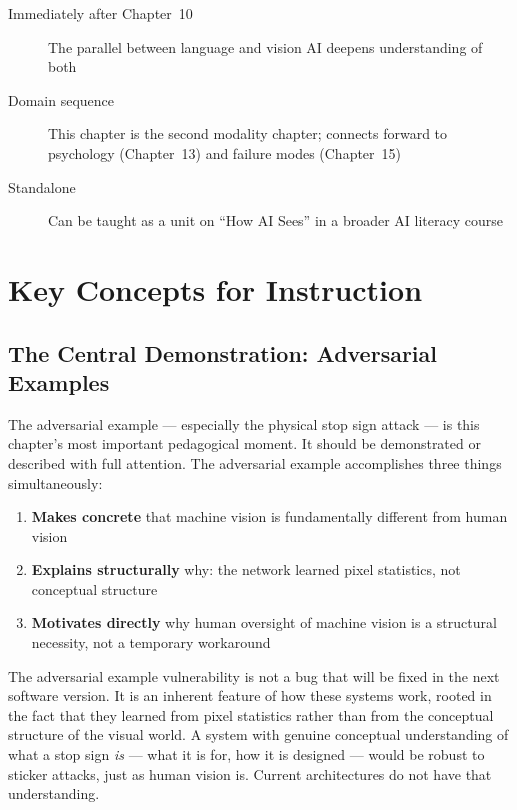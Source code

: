 \begin{description}
    \item[Immediately after Chapter~10] The parallel between language and vision AI deepens understanding of both
    \item[Domain sequence] This chapter is the second modality chapter; connects forward to psychology (Chapter~13) and failure modes (Chapter~15)
    \item[Standalone] Can be taught as a unit on ``How AI Sees'' in a broader AI literacy course
\end{description}

\section{Key Concepts for Instruction}

\subsection{The Central Demonstration: Adversarial Examples}

The adversarial example --- especially the physical stop sign attack --- is this chapter's most important pedagogical moment. It should be demonstrated or described with full attention. The adversarial example accomplishes three things simultaneously:

\begin{enumerate}
    \item \textbf{Makes concrete} that machine vision is fundamentally different from human vision
    \item \textbf{Explains structurally} why: the network learned pixel statistics, not conceptual structure
    \item \textbf{Motivates directly} why human oversight of machine vision is a structural necessity, not a temporary workaround
\end{enumerate}

\begin{keyconcept}
The adversarial example vulnerability is not a bug that will be fixed in the next software version. It is an inherent feature of how these systems work, rooted in the fact that they learned from pixel statistics rather than from the conceptual structure of the visual world. A system with genuine conceptual understanding of what a stop sign \emph{is} --- what it is for, how it is designed --- would be robust to sticker attacks, just as human vision is. Current architectures do not have that understanding.
\end{keyconcept}

